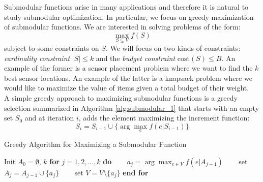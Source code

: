 Submodular functions arise in many applications and therefore it is natural to study submodular optimization. In particular, we focus on greedy maximization of submodular functions. We are interested in solving problems of the form:
\begin{equation}
    \max_{S\subseteq V} f(S)
\end{equation}
subject to some constraints on $S$. We will focus on two kinds of constraints: \textit{cardinality constraint} $|S| \leq k$ and the \textit{budget constraint} $\mathrm{cost}(S)\leq B$. An example of the former is a sensor placement problem where we want to find the $k$ best sensor locations. An example of the latter is a knapsack problem where we would like to maximize the value of items given a total budget of their weight.\\

A simple greedy approach to maximizing submodular functions is a greedy selection summarized in Algorithm \ref{alg:submodular_1} that starts with an empty set $S_0$ and at iteration $i$, adds the element maximizing the increment function:
\begin{equation}
    S_i = S_{i-1} \cup \{\arg \max_e f(e|S_{i-1})\}
\end{equation}

\begin{algorithm}
\caption{Greedy Algorithm for Maximizing a Submodular Function}
\label{alg:submodular_1}
\begin{algorithmic}[1]
\STATE Init $A_0 = \emptyset$, $k$
\STATE \textbf{for} $j=1,2,...,k$ \textbf{do}
\STATE ~~~ $a_j = \arg \max_{e\in V} f(e|A_{j-1})$ 
\STATE ~~~ set $A_j = A_{j-1} \cup \{a_j\}$ 
\STATE ~~~ set $V = V\setminus \{a_j\}$ 
\STATE \textbf{end for}  
\end{algorithmic}
\end{algorithm}


